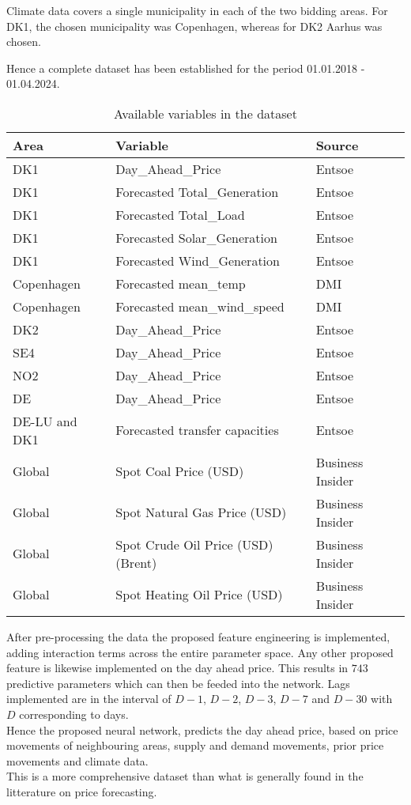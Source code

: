\documentclass[10pt,a4paper]{article}
\numberwithin{equation}{section} %
\begin{document}
Climate data covers a single municipality in each of the two bidding areas. For DK1, the chosen municipality was Copenhagen, whereas for DK2 Aarhus was chosen.

Hence a complete dataset has been established for the period 01.01.2018 - 01.04.2024.
\begin{table}[ht]
\centering
\begin{tabular}{lll}
\hline
\textbf{Area} & \textbf{Variable} & \textbf{Source}\\
\hline
DK1 & Day\_Ahead\_Price  & Entsoe \\
DK1 &Forecasted Total\_Generation  & Entsoe  \\
DK1 &Forecasted Total\_Load  & Entsoe  \\
DK1 &Forecasted Solar\_Generation  & Entsoe \\
DK1 &Forecasted Wind\_Generation  & Entsoe  \\
Copenhagen &Forecasted mean\_temp  & DMI  \\
Copenhagen &Forecasted mean\_wind\_speed  & DMI \\
DK2 & Day\_Ahead\_Price  & Entsoe \\
SE4& Day\_Ahead\_Price  & Entsoe \\
NO2& Day\_Ahead\_Price  & Entsoe \\
DE & Day\_Ahead\_Price  & Entsoe \\
DE-LU and DK1 & Forecasted transfer capacities & Entsoe\\
Global & Spot Coal Price (USD) & Business Insider \\
Global & Spot Natural Gas Price (USD) & Business Insider \\
Global & Spot Crude Oil Price (USD) (Brent) & Business Insider \\
Global & Spot Heating Oil Price (USD) & Business Insider \\
\hline
\end{tabular}
\caption{Available variables in the dataset}
\label{table:variables}
\end{table}
After pre-processing the data the proposed feature engineering is implemented, adding interaction terms across the entire parameter space. Any other proposed feature is likewise implemented on the day ahead price.
This results in $743$ predictive parameters which can then be feeded into the network. Lags implemented are in the interval of $D-1$, $D-2$, $D-3$, $D-7$ and $D-30$ with $D$ corresponding to days.\\
Hence the proposed neural network, predicts the day ahead price, based on price movements of neighbouring areas, supply and demand movements, prior price movements and climate data.\\
This is a more comprehensive dataset than what is generally found in the litterature on price forecasting.\\
\end{document}
